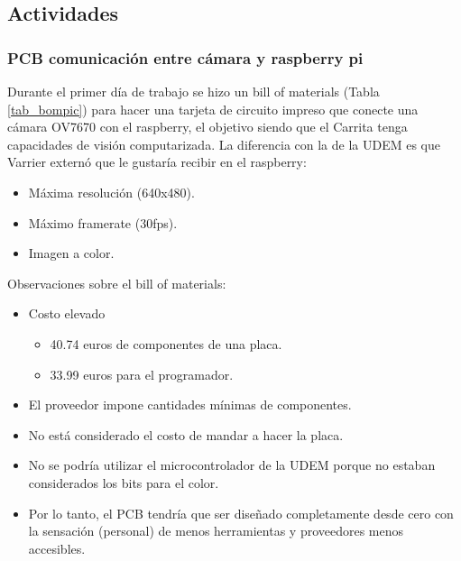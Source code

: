\subsection{Actividades}

\subsubsection{PCB comunicación entre cámara y raspberry pi}
Durante el primer día de trabajo se hizo un bill of materials (Tabla \ref{tab_bompic}) para hacer una tarjeta de circuito impreso que conecte una cámara OV7670 con el raspberry, el objetivo siendo que el Carrita tenga capacidades de visión computarizada. La diferencia con la de la UDEM es que Varrier externó que le gustaría recibir en el raspberry:
\begin{itemize}
	\item Máxima resolución (640x480).
	\item Máximo framerate (30fps).
	\item Imagen a color.
\end{itemize}

Observaciones sobre el bill of materials:
\begin{itemize}
	\item Costo elevado
	\begin{itemize}
		\item 40.74 euros de componentes de una placa.
		\item 33.99 euros para el programador.
	\end{itemize}
	\item El proveedor impone cantidades mínimas de componentes.
	\item No está considerado el costo de mandar a hacer la placa.
	\item No se podría utilizar el microcontrolador de la UDEM porque no estaban considerados los bits para el color.
	\item Por lo tanto, el PCB tendría que ser diseñado completamente desde cero con la sensación (personal) de menos herramientas y proveedores menos accesibles.
\end{itemize}


